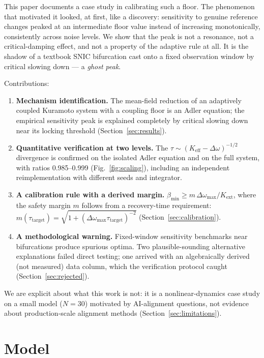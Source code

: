 \documentclass[11pt]{article}
\newcommand{\Keff}{K_{\mathrm{eff}}}
\newcommand{\bmin}{\beta_{\min}}
\newcommand{\dw}{\Delta\omega}
\begin{document}
This paper documents a case study in calibrating such a floor. The phenomenon
that motivated it looked, at first, like a discovery: sensitivity to genuine
reference changes peaked at an intermediate floor value instead of increasing
monotonically, consistently across noise levels. We show that the peak is not
a resonance, not a critical-damping effect, and not a property of the adaptive
rule at all. It is the shadow of a textbook SNIC bifurcation
\cite{adler1946,strogatzbook,ermentrout1986} cast onto a fixed observation
window by critical slowing down --- a \emph{ghost peak}.

Contributions:
\begin{enumerate}
\item \textbf{Mechanism identification.} The mean-field reduction of an
  adaptively coupled Kuramoto system with a coupling floor is an Adler
  equation; the empirical sensitivity peak is explained completely by critical
  slowing down near its locking threshold (Section~\ref{sec:results}).
\item \textbf{Quantitative verification at two levels.} The
  $\tau \sim (\Keff - \dw)^{-1/2}$ divergence is confirmed on the isolated
  Adler equation and on the full system, with ratios 0.985--0.999
  (Fig.~\ref{fig:scaling}), including an independent reimplementation with
  different seeds and integrator.
\item \textbf{A calibration rule with a derived margin.}
  $\bmin \ge m\,\dw_{\max}/K_{\mathrm{ext}}$, where the safety margin $m$
  follows from a recovery-time requirement:
  $m(\tau_{\mathrm{target}}) = \sqrt{1+(\dw_{\max}\tau_{\mathrm{target}})^{-2}}$
  (Section~\ref{sec:calibration}).
\item \textbf{A methodological warning.} Fixed-window sensitivity benchmarks
  near bifurcations produce spurious optima. Two plausible-sounding
  alternative explanations failed direct testing; one arrived with an
  algebraically derived (not measured) data column, which the verification
  protocol caught (Section~\ref{sec:rejected}).
\end{enumerate}

We are explicit about what this work is not: it is a nonlinear-dynamics case
study on a small model ($N=30$) motivated by AI-alignment questions, not
evidence about production-scale alignment methods (Section~\ref{sec:limitations}).

\section{Model}\label{sec:model}
\end{document}
